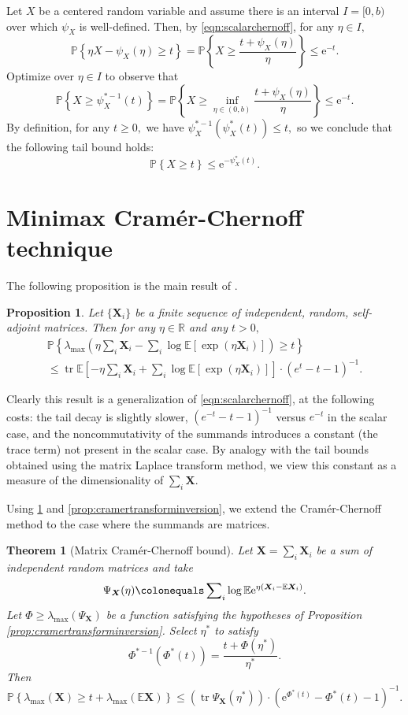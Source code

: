 \documentclass[reqno]{amsart}
\renewcommand{\star}{*}
\newcommand{\mat}[1]{\ensuremath{\bm{#1}}} %
\newcommand{\e}{\ensuremath{\mathrm{e}}}
\newcommand{\E}{\ensuremath{\mathbb{E}}}
\newcommand{\Prob}[1]{\ensuremath{\mathbb{P}\left\{#1\right\}}}
\newcommand{\R}{\ensuremath{\mathbb{R}}}
\newcommand{\lambdamax}[1]{\ensuremath{\lambda_{\mathrm{max}}\left(#1\right)}}
\DeclareMathOperator{\tr}{tr}
\newtheorem{thm}{Theorem}
\newtheorem{prop}{Proposition}
\theoremstyle{remark}
\begin{document}
Let $X$ be a centered random variable and assume there is an interval $I = [0,b)$ over which $\psi_X$ is well-defined. Then, by \eqref{eqn:scalarchernoff}, for any $\eta \in I,$
\[
\Prob{\eta X - \psi_X(\eta) \geq t} = \Prob{ X \geq \frac{ t + \psi_X(\eta)}{\eta}} \leq \e^{-t}.
\]
Optimize over $\eta \in I$ to observe that
\[
\Prob{ X \geq \psi_X^{*-1}(t) } = \Prob{X \geq \inf_{\eta \in (0,b)} \frac{t + \psi_X(\eta)}{\eta}} \leq \e^{-t}.
\]
By definition, for any $t \geq 0,$ we have $\psi_X^{*-1}(\psi^\star_X(t)) \leq t,$ so we conclude that the following tail bound holds:
\[
\Prob{X \geq t} \leq \e^{-\psi^\star_X(t)}.
\]

\section{Minimax Cram\'er-Chernoff technique}
The following proposition is the main result of \cite{dimensionfree}.
\begin{prop}
Let \( \{\mat{X}_i\} \) be a finite sequence of independent, random, self-adjoint matrices. Then for any \(\eta \in \R\) and any \(t > 0,\)
\begin{multline*}
\Prob{\lambdamax{\eta \sum\nolimits_i \mat{X}_i - \sum\nolimits_i \log \E[ \exp(\eta \mat{X}_i) ]} \geq t }  \\
\leq \tr{\E \left[ -\eta \sum\nolimits_i \mat{X}_i + \sum\nolimits_i \log \E[ \exp(\eta \mat{X}_i) ] \right]} \cdot (e^t - t - 1)^{-1}.
\end{multline*}
\label{prop:matrixdeviation}
\end{prop}

Clearly this result is a generalization of \eqref{eqn:scalarchernoff}, at the following costs: the tail decay is slightly slower, $(e^{-t} - t - 1)^{-1}$ versus $e^{-t}$ in the scalar case, and the noncommutativity of the summands introduces a constant (the trace term) not present in the scalar case. By analogy with the tail bounds obtained using the matrix Laplace transform method, we view this constant as a measure of the dimensionality of $\sum_i \mat{X}.$

Using \ref{prop:matrixdeviation} and \ref{prop:cramertransforminversion}, we extend the Cram\'er-Chernoff method to the case where the summands are matrices.

\begin{thm}[Matrix Cram\'er-Chernoff bound]
Let $\mat{X} = \sum\nolimits_i \mat{X}_i$ be a sum of independent random matrices and take
\[
\Psi_{\mat{X}}(\eta) \colonequals \sum\nolimits_i \log \E\e^{\eta (\mat{X}_i - \E \mat{X}_i)}.
\]
Let $\Phi \geq \lambdamax{\Psi_{\mat{X}}}$ be a function satisfying the hypotheses of Proposition \ref{prop:cramertransforminversion}. Select $\eta^\star$ to satisfy
\[
\Phi^{\star-1}(\Phi^*(t)) = \frac{t + \Phi(\eta^\star)}{\eta^\star}.
\]
Then
\[
\Prob{\lambdamax{\mat{X}} \geq t + \lambdamax{\E \mat{X}} } \leq ( \tr \Psi_{\mat{X}}(\eta^\star) ) \cdot (\e^{\Phi^\star(t)} - \Phi^\star(t) -1)^{-1}.
\]
\end{thm}
\end{document}
